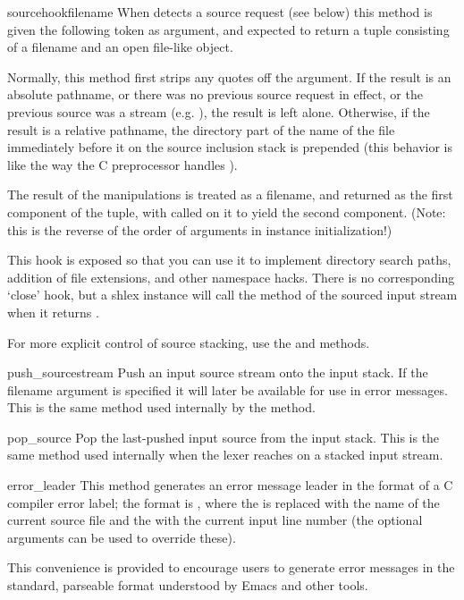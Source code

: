 \begin{methoddesc}{sourcehook}{filename}
When  detects a source request (see
 below) this method is given the following token as
argument, and expected to return a tuple consisting of a filename and
an open file-like object.

Normally, this method first strips any quotes off the argument.  If
the result is an absolute pathname, or there was no previous source
request in effect, or the previous source was a stream
(e.g. ), the result is left alone.  Otherwise, if the
result is a relative pathname, the directory part of the name of the
file immediately before it on the source inclusion stack is prepended
(this behavior is like the way the C preprocessor handles
).

The result of the manipulations is treated as a filename, and returned
as the first component of the tuple, with
 called on it to yield the second component. (Note:
this is the reverse of the order of arguments in instance initialization!)

This hook is exposed so that you can use it to implement directory
search paths, addition of file extensions, and other namespace hacks.
There is no corresponding `close' hook, but a shlex instance will call
the  method of the sourced input stream when it
returns \EOF.

For more explicit control of source stacking, use the
 and  methods. 
\end{methoddesc}

\begin{methoddesc}{push_source}{stream}
Push an input source stream onto the input stack.  If the filename
argument is specified it will later be available for use in error
messages.  This is the same method used internally by the
 method.
\end{methoddesc}

\begin{methoddesc}{pop_source}{}
Pop the last-pushed input source from the input stack.
This is the same method used internally when the lexer reaches
\EOF{} on a stacked input stream.
\end{methoddesc}

\begin{methoddesc}{error_leader}{}
This method generates an error message leader in the format of a
\UNIX{} C compiler error label; the format is ,
where the  is replaced with the name of the current source
file and the  with the current input line number (the
optional arguments can be used to override these).

This convenience is provided to encourage  users to
generate error messages in the standard, parseable format understood
by Emacs and other \UNIX{} tools.
\end{methoddesc}

